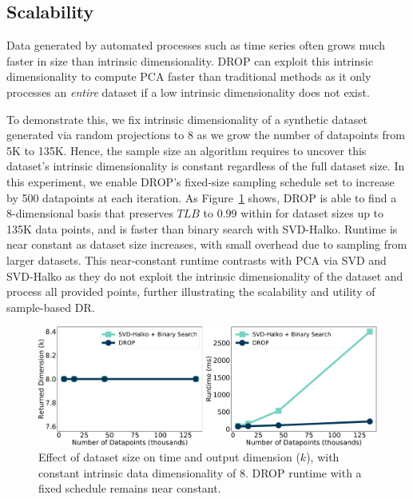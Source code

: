 \subsection{Scalability}
\label{subsec:scale}


Data generated by automated processes such as time series often grows much faster in size than intrinsic dimensionality.
DROP can exploit this intrinsic dimensionality to compute PCA faster than traditional methods as it only processes an \emph{entire} dataset if a low intrinsic dimensionality does not exist. 

To demonstrate this, we fix intrinsic dimensionality of a synthetic dataset generated via random projections to 8 as we grow the number of datapoints from 5K to 135K. 
Hence, the sample size an algorithm requires to uncover this dataset's intrinsic dimensionality is constant regardless of the full dataset size. 
In this experiment, we enable DROP's fixed-size sampling schedule set to increase by 500 datapoints at each iteration. 
As Figure~\ref{fig:increasingdata} shows, DROP is able to find a 8-dimensional basis that preserves $TLB$ to $0.99$ within  for dataset sizes up to 135K data points, and is \red{$12\times$} faster than binary search with SVD-Halko. 
Runtime is near constant as dataset size increases, with small overhead due to sampling from larger datasets.
This near-constant runtime contrasts with PCA via SVD and SVD-Halko as they do not exploit the intrinsic dimensionality of the dataset and process all provided points, further illustrating the scalability and utility of sample-based DR.


\begin{figure}
\includegraphics[width=\linewidth]{figs/increasing-revision.pdf}
\caption[]{Effect of dataset size on time and output dimension ($k$), with constant intrinsic data dimensionality of 8. DROP runtime with a fixed schedule remains near constant.}
\label{fig:increasingdata}
\end{figure}


